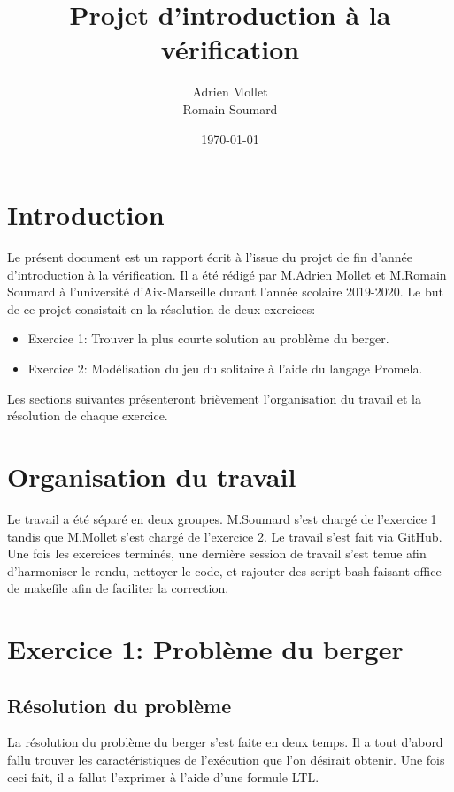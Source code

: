 \documentclass[12pt, a4paper]{report}
\title{\color{blue}Projet d'introduction à la vérification}
\date{\today}
\author{Adrien Mollet\\ Romain Soumard}
\begin{document}
\maketitle

\section{Introduction}

Le présent document est un rapport écrit à l'issue du projet de fin d'année d'introduction à la vérification. Il a été rédigé par M.Adrien Mollet et M.Romain Soumard à l'université d'Aix-Marseille durant l'année scolaire 2019-2020.
Le but de ce projet consistait en la résolution de deux exercices:
\begin{itemize}
\item Exercice 1:  Trouver la plus courte solution au problème du berger.
\item Exercice 2: Modélisation du jeu du solitaire à l'aide du langage Promela.
\end{itemize}
Les sections suivantes présenteront brièvement l'organisation du travail et la résolution de chaque exercice.

\section{Organisation du travail}

Le travail a été séparé en deux groupes. M.Soumard s'est chargé de l'exercice 1 tandis que M.Mollet s'est chargé de l'exercice 2. Le travail s'est fait via GitHub. Une fois les exercices terminés, une dernière session de travail s'est tenue afin d'harmoniser le rendu, nettoyer le code, et rajouter des script bash faisant office de makefile afin de faciliter la correction.

\section{Exercice 1: Problème du berger}

\subsection{Résolution du problème}

La résolution du problème du berger s'est faite en deux temps. Il a tout d'abord fallu trouver les caractéristiques de l'exécution que l'on désirait obtenir. Une fois ceci fait, il a fallut l'exprimer à l'aide d'une formule LTL.
\end{document}
